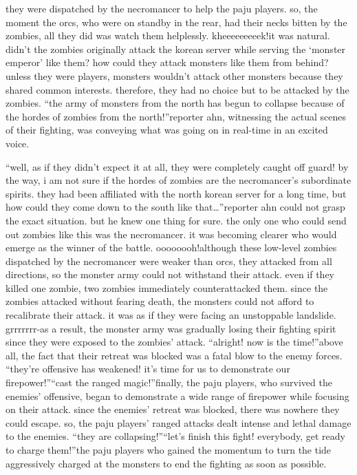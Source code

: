  they were dispatched by the necromancer to help the paju players.
so, the moment the orcs, who were on standby in the rear, had their necks bitten by the zombies, all they did was watch them helplessly.
kheeeeeeeeek!it was natural.
 didn’t the zombies originally attack the korean server while serving the ‘monster emperor’ like them? how could they attack monsters like them from behind?unless they were players, monsters wouldn’t attack other monsters because they shared common interests.
 therefore, they had no choice but to be attacked by the zombies.
“the army of monsters from the north has begun to collapse because of the hordes of zombies from the north!”reporter ahn, witnessing the actual scenes of their fighting, was conveying what was going on in real-time in an excited voice.

“well, as if they didn’t expect it at all, they were completely caught off guard! by the way, i am not sure if the hordes of zombies are the necromancer’s subordinate spirits.
 they had been affiliated with the north korean server for a long time, but how could they come down to the south like that…”reporter ahn could not grasp the exact situation.
 but he knew one thing for sure.
 the only one who could send out zombies like this was the necromancer.
it was becoming clearer who would emerge as the winner of the battle.
oooooooh!although these low-level zombies dispatched by the necromancer were weaker than orcs, they attacked from all directions, so the monster army could not withstand their attack.
 even if they killed one zombie, two zombies immediately counterattacked them.
since the zombies attacked without fearing death, the monsters could not afford to recalibrate their attack.
 it was as if they were facing an unstoppable landslide.
grrrrrrr-as a result, the monster army was gradually losing their fighting spirit since they were exposed to the zombies’ attack.
“alright! now is the time!”above all, the fact that their retreat was blocked was a fatal blow to the enemy forces.
“they’re offensive has weakened! it’s time for us to demonstrate our firepower!”“cast the ranged magic!”finally, the paju players, who survived the enemies’ offensive, began to demonstrate a wide range of firepower while focusing on their attack.
since the enemies’ retreat was blocked, there was nowhere they could escape.
 so, the paju players’ ranged attacks dealt intense and lethal damage to the enemies.
“they are collapsing!”“let’s finish this fight! everybody, get ready to charge them!”the paju players who gained the momentum to turn the tide aggressively charged at the monsters to end the fighting as soon as possible.

